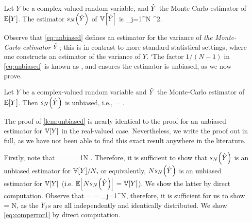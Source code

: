 Let $Y$ be a complex-valued random variable, and $\hat{Y}$ the Monte-Carlo estimator of $\EXP{Y}$. The estimator $\unbiased{\Yhat}{N}$ of $\VAR{\Yhat}$ is
\beq\label{eq:unbiased}
 \de {} \sum_{j=1}^N \abs{\Yj - \Yhat}^2.
\eeq
\ede

Observe that \cref{eq:unbiased} defines an estimator for the variance of \emph{the Monte-Carlo estimator $\hat{Y}$}; this is in contrast to more standard statistical settings, where one constructs an estimator of the variance of $Y$. `The factor $1/(N-1)$ in \cref{eq:unbiased} is known as , and ensures the estimator is unbiased, as we now prove.

\label{lem:unbiased}
Let $Y$ be a complex-valued random variable and  $\hat{Y}$ the Monte-Carlo estimator of $\EXP{Y}$. Then $\unbiased{\Yhat}{N}$ is unbiased, i.e.,
\beqs
{} = \VAR{\Yhat}.
\eeqs
\ele

The proof of \cref{lem:unbiased} is nearly identical to the proof for an unbiased estimator for $\VAR{Y}$ in the real-valued case. Nevertheless, we write the proof out in full, as we have not been able to find this exact result anywhere in the literature.

Firstly, note that
\beqs
\VAR{\Yhat} =  =   = \frac1N .
\eeqs
Therefore, it is sufficient to show that $\unbiased{\Yhat}{N}$ is an unbiased estimator for $\VAR{Y}/N,$ or equivalently, $N\unbiased{\Yhat}{N}$ is an unbiased estimator for $\VAR{Y}$ (i.e. $\EXP{N\unbiased{\Yhat}{N}} = \VAR{Y}$). We show the latter by direct computation. Observe that
\beqs
{} =  =  \sum_{j=1}^N,
\eeqs
therefore, it is sufficient for us to show
\beq\label{eq:comperror1}
 = N,
\eeq
as the $Y_{j}$s are all independently and identically distributed. We show \cref{eq:comperror1} by direct computation.

